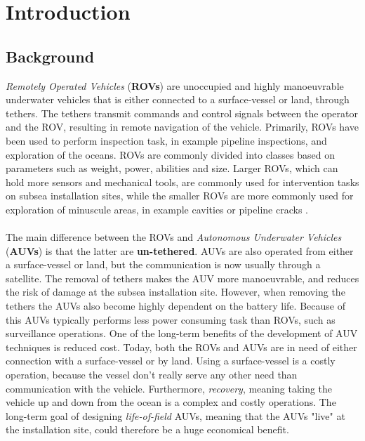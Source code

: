 \chapter{Introduction}
\section{Background}
\textit{Remotely Operated Vehicles} (\textbf{ROVs}) are unoccupied and highly manoeuvrable underwater vehicles that is either connected to a surface-vessel or land, through tethers. The tethers transmit commands and control signals between the operator and the ROV, resulting in remote navigation of the vehicle. Primarily, ROVs have been used to perform inspection task, in example pipeline inspections, and exploration of the oceans. ROVs are commonly divided into classes based on parameters such as weight, power, abilities and size. Larger ROVs, which can hold more sensors and mechanical tools, are commonly used for intervention tasks on subsea installation sites, while the smaller ROVs are more commonly used for exploration of minuscule areas, in example cavities or pipeline cracks \cite{Dasgupta}.\\\\
The main difference between the ROVs and \textit{Autonomous Underwater Vehicles} (\textbf{AUVs}) is that the latter are \textbf{un-tethered}. AUVs are also operated from either a surface-vessel or land, but the communication is now usually through a satellite. The removal of tethers makes the AUV more manoeuvrable, and reduces the risk of damage at the subsea installation site. However, when removing the tethers the AUVs also become highly dependent on the battery life. Because of this AUVs typically performs less power consuming task than ROVs, such as surveillance operations. One of the long-term benefits of the development of AUV techniques is reduced cost. Today, both the ROVs and AUVs are in need of either connection with a surface-vessel or by land. Using a surface-vessel is a costly operation, because the vessel don't really serve any other need than communication with the vehicle. Furthermore, \textit{recovery}, meaning taking the vehicle up and down from the ocean is a complex and costly operations. The long-term goal of designing \textit{life-of-field} AUVs, meaning that the AUVs "live" at the installation site, could therefore be a huge economical benefit. 
